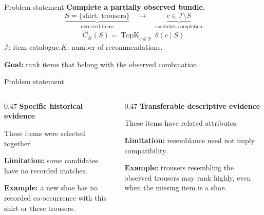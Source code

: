 \documentclass[11pt,aspectratio=169]{beamer}
\newcommand{\key}[1]{\textcolor{Accent}{\textbf{#1}}}
\begin{document}
\begin{frame}{Problem statement}
\key{Complete a partially observed bundle.}
\vspace{5mm}
\[
 \underbrace{S=\{\text{shirt, trousers}\}}_{\text{observed items}}
 \quad\longrightarrow\quad
 \underbrace{c\in\mathcal I\setminus S}_{\text{candidate completion}}
\]
\vspace{5mm}
\[
 \boxed{\widehat C_K(S)=\operatorname{TopK}_{c\notin S}\;\theta(c\mid S)}
\]
\vspace{4mm}
$\mathcal I$: item catalogue.\quad $K$: number of recommendations.\par
\vspace{3mm}
\textbf{Goal:} rank items that belong with the observed combination.
\end{frame}

\begin{frame}{Problem statement}
\begin{columns}[T,onlytextwidth]
\begin{column}{0.47\textwidth}
\key{Specific historical evidence}\par\vspace{4mm}
These items were selected together.\par\vspace{4mm}
\textbf{Limitation:} some candidates have no recorded matches.\par\vspace{3mm}
\textbf{Example:} a new shoe has no recorded co-occurrence with this shirt or these trousers.
\end{column}
\begin{column}{0.47\textwidth}
\key{Transferable descriptive evidence}\par\vspace{4mm}
These items have related attributes.\par\vspace{4mm}
\textbf{Limitation:} resemblance need not imply compatibility.\par\vspace{3mm}
\textbf{Example:} trousers resembling the observed trousers may rank highly, even when the missing item is a shoe.
\end{column}
\end{columns}
\end{frame}
\end{document}
